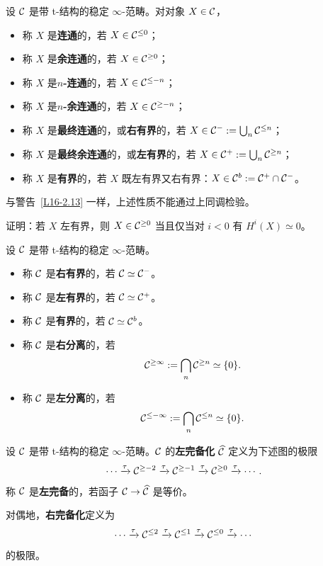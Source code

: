 \begin{definition}\label{L16-3.1}
设 $\mathcal{C}$ 是带 t-结构的稳定 $\infty$-范畴。对对象 $X\in\mathcal{C}$，
\begin{itemize}[leftmargin=2.2em,itemsep=0.1em]
\item 称 $X$ 是\textbf{连通}的，若 $X\in\mathcal{C}^{\le0}$；
\item 称 $X$ 是\textbf{余连通}的，若 $X\in\mathcal{C}^{\ge0}$；
\item 称 $X$ 是\textbf{$n$-连通}的，若 $X\in\mathcal{C}^{\le-n}$；
\item 称 $X$ 是\textbf{$n$-余连通}的，若 $X\in\mathcal{C}^{\ge-n}$；
\item 称 $X$ 是\textbf{最终连通}的，或\textbf{右有界}的，若 $X\in\mathcal{C}^{-}:=\bigcup_n\mathcal{C}^{\le n}$；
\item 称 $X$ 是\textbf{最终余连通}的，或\textbf{左有界}的，若 $X\in\mathcal{C}^{+}:=\bigcup_n\mathcal{C}^{\ge n}$；
\item 称 $X$ 是\textbf{有界}的，若 $X$ 既左有界又右有界：$X\in\mathcal{C}^{b}:=\mathcal{C}^{+}\cap\mathcal{C}^{-}$。
\end{itemize}
\end{definition}

\begin{warning}\label{L16-3.2}
与警告~\ref{L16-2.13} 一样，上述性质不能通过上同调检验。
\end{warning}

\begin{exercise}\label{L16-3.3}
证明：若 $X$ 左有界，则 $X\in\mathcal{C}^{\ge0}$ 当且仅当对 $i<0$ 有 $H^i(X)\simeq0$。
\end{exercise}

\begin{definition}\label{L16-3.4}
设 $\mathcal{C}$ 是带 t-结构的稳定 $\infty$-范畴。
\begin{itemize}[leftmargin=2.2em,itemsep=0.1em]
\item 称 $\mathcal{C}$ 是\textbf{右有界}的，若 $\mathcal{C}\simeq\mathcal{C}^{-}$。
\item 称 $\mathcal{C}$ 是\textbf{左有界}的，若 $\mathcal{C}\simeq\mathcal{C}^{+}$。
\item 称 $\mathcal{C}$ 是\textbf{有界}的，若 $\mathcal{C}\simeq\mathcal{C}^{b}$。
\item 称 $\mathcal{C}$ 是\textbf{右分离}的，若
\[
\mathcal{C}^{\ge\infty}:=\bigcap_n\mathcal{C}^{\ge n}\simeq\{0\}.
\]
\item 称 $\mathcal{C}$ 是\textbf{左分离}的，若
\[
\mathcal{C}^{\le-\infty}:=\bigcap_n\mathcal{C}^{\le n}\simeq\{0\}.
\]
\end{itemize}
\end{definition}

\begin{definition}\label{L16-3.5}
设 $\mathcal{C}$ 是带 t-结构的稳定 $\infty$-范畴。$\mathcal{C}$ 的\textbf{左完备化} $\widehat{\mathcal{C}}$ 定义为下述图的极限
\[
\cdots\xrightarrow{\tau}\mathcal{C}^{\ge-2}\xrightarrow{\tau}\mathcal{C}^{\ge-1}\xrightarrow{\tau}\mathcal{C}^{\ge0}\xrightarrow{\tau}\cdots.
\]
称 $\mathcal{C}$ 是\textbf{左完备}的，若函子 $\mathcal{C}\to\widehat{\mathcal{C}}$ 是等价。

对偶地，\textbf{右完备化}定义为
\[
\cdots\xrightarrow{\tau}\mathcal{C}^{\le2}\xrightarrow{\tau}\mathcal{C}^{\le1}\xrightarrow{\tau}\mathcal{C}^{\le0}\xrightarrow{\tau}\cdots
\]
的极限。
\end{definition}

